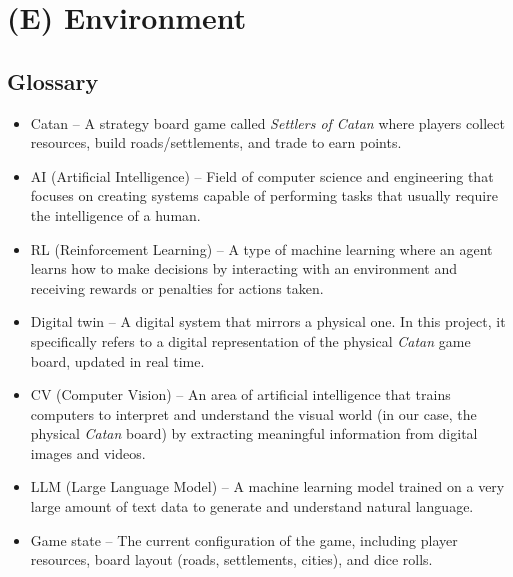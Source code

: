 \documentclass{article}
\begin{document}
\newpage{}



\section*{(E) Environment}\label{sec:srs-environment}
\renewcommand{\thesubsection}{E.\arabic{subsection}}
\setcounter{subsection}{0}

\subsection{Glossary}\label{subsec:glossary}
\begin{itemize}
    \item {Catan} – A strategy board game called \textit{Settlers of \emph{Catan}} where players collect resources, build roads/settlements, and trade to earn points.
    \item {AI (Artificial Intelligence)} – Field of computer science and engineering that focuses on creating systems capable of performing tasks that usually require the intelligence of a human.
    \item {RL (Reinforcement Learning)} – A type of machine learning where an agent learns how to make decisions by interacting with an environment and receiving rewards or penalties for actions taken.
    \item {Digital twin} – A digital system that mirrors a physical one. In this project, it specifically refers to a digital representation of the physical \emph{Catan} game board, updated in real time.
    \item {CV (Computer Vision)} – An area of artificial intelligence that trains computers to interpret and understand the visual world (in our case, the physical \emph{Catan} board) by extracting meaningful information from digital images and videos.
    \item {LLM (Large Language Model)} – A machine learning model trained on a very large amount of text data to generate and understand natural language.
    \item {Game state} – The current configuration of the game, including player resources, board layout (roads, settlements, cities), and dice rolls.
\end{itemize}
\end{document}
